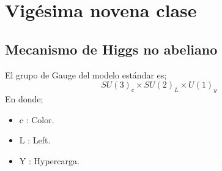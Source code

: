 \documentclass[../main.tex]{subfiles}
\begin{document}
\section{Vigésima novena clase}
\subsection{Mecanismo de Higgs no abeliano}
El grupo de Gauge del modelo estándar es;
\begin{equation}
  SU(3)_c\times SU(2)_L\times U(1)_y
 \end{equation}
En donde;
\begin{itemize}
  \item c : Color.
  \item L : Left.
  \item Y : Hypercarga.
\end{itemize}
\end{document}
